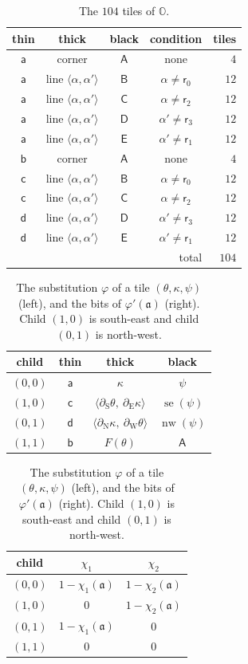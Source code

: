 \begin{table}[ht]
\centering
\begin{tabular}{c|c|c|c|r}
thin & thick & black & condition & tiles\\\hline
$\mathsf a$ & corner & $\mathsf A$ & none & $4$\\
$\mathsf a$ & line $\langle\alpha,\alpha'\rangle$ & $\mathsf B$ & $\alpha\ne\mathsf r_0$ & $12$\\
$\mathsf a$ & line $\langle\alpha,\alpha'\rangle$ & $\mathsf C$ & $\alpha\ne\mathsf r_2$ & $12$\\
$\mathsf a$ & line $\langle\alpha,\alpha'\rangle$ & $\mathsf D$ & $\alpha'\ne\mathsf r_3$ & $12$\\
$\mathsf a$ & line $\langle\alpha,\alpha'\rangle$ & $\mathsf E$ & $\alpha'\ne\mathsf r_1$ & $12$\\
$\mathsf b$ & corner & $\mathsf A$ & none & $4$\\
$\mathsf c$ & line $\langle\alpha,\alpha'\rangle$ & $\mathsf B$ & $\alpha\ne\mathsf r_0$ & $12$\\
$\mathsf c$ & line $\langle\alpha,\alpha'\rangle$ & $\mathsf C$ & $\alpha\ne\mathsf r_2$ & $12$\\
$\mathsf d$ & line $\langle\alpha,\alpha'\rangle$ & $\mathsf D$ & $\alpha'\ne\mathsf r_3$ & $12$\\
$\mathsf d$ & line $\langle\alpha,\alpha'\rangle$ & $\mathsf E$ & $\alpha'\ne\mathsf r_1$ & $12$\\\hline
\multicolumn{4}{r|}{total} & $104$
\end{tabular}
\caption{The $104$ tiles of $\mathbb O$.}
\label{tab:alphabet}
\end{table}

\begin{table}[ht]
\centering
\begin{tabular}{c|c|c|c}
child & thin & thick & black\\\hline
$(0,0)$ & $\mathsf a$ & $\kappa$ & $\psi$\\
$(1,0)$ & $\mathsf c$ & $\langle\partial_{\mathrm S}\theta,\ \partial_{\mathrm E}\kappa\rangle$ & $\operatorname{se}(\psi)$\\
$(0,1)$ & $\mathsf d$ & $\langle\partial_{\mathrm N}\kappa,\ \partial_{\mathrm W}\theta\rangle$ & $\operatorname{nw}(\psi)$\\
$(1,1)$ & $\mathsf b$ & $F(\theta)$ & $\mathsf A$
\end{tabular}
\qquad
\begin{tabular}{c|c|c}
child & $\chi_1$ & $\chi_2$\\\hline
$(0,0)$ & $1-\chi_1(\mathfrak a)$ & $1-\chi_2(\mathfrak a)$\\
$(1,0)$ & $0$ & $1-\chi_2(\mathfrak a)$\\
$(0,1)$ & $1-\chi_1(\mathfrak a)$ & $0$\\
$(1,1)$ & $0$ & $0$
\end{tabular}
\caption{The substitution $\varphi$ of a tile $(\theta,\kappa,\psi)$ (left), and the bits of $\varphi'(\mathfrak a)$ (right). Child $(1,0)$ is south-east and child $(0,1)$ is north-west.}
\label{tab:subst}
\end{table}

